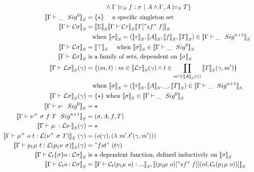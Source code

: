 \begin{align*}
      & \quad \quad \quad \land  {\goodSealS{\Gamma}{f}{\sigma}{A}}
      \land  {\goodTypeS{\Gamma, A}{T}{i}} 
  \} \\ 
  \denotesS{\goodSig{\Gamma}{\_}{0}} &= \{\star\} \quad \text{ a specific singleton set} \\
  \denotesS{\goodType{\Gamma}{\cC \sigma}{}} &= \denotesS{\Sigma} \denotesS{\goodType{\Gamma}{\cC \tau}{}} \denotesS{T["sf" \ f]} \\
  & \quad \text{when } \denotesS{\sigma} = (\denotesS{\tau}, \denotesS{A}, \denotesS{f} , \denotesS{T}) \in \denotesS{\goodSig{\Gamma}{\_}{n+1}} \\
  \denotesS{\goodType{\Gamma}{\cC \sigma}{i}}&= \denotesS{\top}\quad \text{ when } \denotesS{\sigma} \in \denotesS{\goodSig{\Gamma}{\_}{0}} \\
  \denotesS{\goodType{\Gamma}{\cL \sigma}{i}} & \text{ is a family of sets, dependent on } \denotesS{\sigma}  \\
  \denotesS{\goodType{\Gamma}{\cL \sigma}{i}} (\gamma)&= \{(m, t) :  m \in \denotesS{\cL \tau}(\gamma) \land t \in \prod_{m' \in \denotesS{A}(\gamma)}\denotesS{T}(\gamma, m')  \}  \\
  & \quad \text{when } \denotesS{\sigma} = (\denotesS{\tau}, \denotesS{A}, \_, \denotesS{T}) \in \denotesS{\goodSig{\Gamma}{\_}{n+1}} \\
  \denotesS{\goodType{\Gamma}{\cL \sigma}{i}} (\gamma)&= \{\star\} \text{ when } \denotesS{\sigma} \in \denotesS{\goodSig{\Gamma}{\_}{0}} \\
  \denotesS{\goodSig{\Gamma}{\nu\cdot}{0}} &= \star \\
  \denotesS{\goodSig{\Gamma}{\nu^+ \ \sigma \ f \ T}{n+1}} &= (\sigma, A, f, T) \\
  \denotesS{\goodTerm{\Gamma}{\mu\cdot}{\cL \nu\cdot} } (\gamma) &= \star \\
  \denotesS{\goodTerm{\Gamma}{\mu^+ \ o \ t}{\cL(\nu^+ \ \sigma  \ T)}} \ (\gamma)&= (o(\gamma), (\lambda \ m' . t'(\gamma, m'))) \\
  \denotesS{\goodTerm{\Gamma}{p_1\mu~t}{\cL(p_1\nu~\sigma)}}(\gamma) &=  "fst"~(t\gamma) \\ 
  \denotesS{\goodTerm{\Gamma}{\cCt \{\sigma\} o}{\cC\sigma}} & \text{ is a dependent function, defined inductively on } \denotesS{\sigma} \\
  \denotesS{\goodTerm{\Gamma}{\cCt o}{\cC\sigma}}
  &= \denotesS{\goodTerm{\Gamma}{\cCt (p_1\mu \ o)}{...}}, \denotesS{(p_2\mu \ o)["sf" \ f][(id, \cCt (p_1\mu \ o))]} \\

\end{align*}
